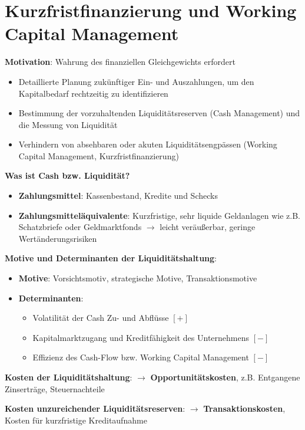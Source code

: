 \section{Kurzfristfinanzierung und Working Capital Management}

\textbf{Motivation}: Wahrung des finanziellen Gleichgewichts erfordert
\begin{itemize}
	\item Detaillierte Planung zukünftiger Ein- und Auszahlungen, um den Kapitalbedarf rechtzeitig zu identifizieren
	\item Bestimmung der vorzuhaltenden Liquiditätsreserven (Cash Management) und die Messung von Liquidität
	\item Verhindern von absehbaren oder akuten Liquiditätsengpässen (Working Capital Management, Kurzfristfinanzierung)
\end{itemize}
\bigskip
\textbf{Was ist Cash bzw. Liquidität?}
\begin{itemize}
	\item \textbf{Zahlungsmittel}: Kassenbestand, Kredite und Schecks
	\item \textbf{Zahlungsmitteläquivalente}: Kurzfristige, sehr liquide Geldanlagen wie z.B. Schatzbriefe oder Geldmarktfonds $\rightarrow$ leicht veräußerbar, geringe Wertänderungsrisiken
\end{itemize}
\bigskip
\textbf{Motive und Determinanten der Liquiditätshaltung}:
\begin{itemize}
	\item \textbf{Motive}: Vorsichtsmotiv, strategische Motive, Transaktionsmotive
	\item \textbf{Determinanten}:
	\begin{itemize}
		\item Volatilität der Cash Zu- und Abflüsse $[+]$
		\item Kapitalmarktzugang und Kreditfähigkeit des Unternehmens $[-]$
		\item Effizienz des Cash-Flow bzw. Working Capital Management $[-]$
	\end{itemize}
\end{itemize}
\bigskip
\textbf{Kosten der Liquiditätshaltung}: $\rightarrow$ \textbf{Opportunitätskosten}, z.B. Entgangene Zinserträge, Steuernachteile

\textbf{Kosten unzureichender Liquiditätsreserven}: $\rightarrow$ \textbf{Transaktionskosten}, Kosten für kurzfristige Kreditaufnahme 

